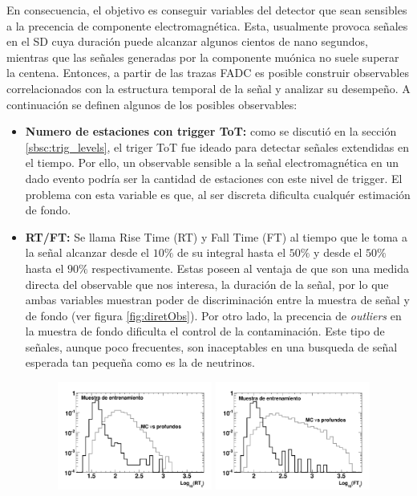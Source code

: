 	En consecuencia, el objetivo es conseguir variables del detector que sean sensibles a la precencia de componente electromagnética.
	Esta, usualmente provoca señales en el SD cuya duración puede alcanzar algunos cientos de nano segundos, mientras que las señales generadas por la componente muónica no suele superar la centena.
	Entonces, a partir de las trazas FADC es posible construir observables correlacionados con la estructura temporal de la señal y analizar su desempeño.
	A continuación se definen algunos de los posibles observables:
	\begin{itemize}
	 \item \textbf{Numero de estaciones con trigger ToT:} como se discutió en la sección \ref{sbsc:trig_levels}, el triger ToT fue ideado para detectar señales extendidas en el tiempo.
	 Por ello, un observable sensible a la señal electromagnética en un dado evento podría ser la cantidad de estaciones con este nivel de trigger.
	 El problema con esta variable es que, al ser discreta dificulta cualquér estimación de fondo.
	 \item \textbf{RT/FT:} Se llama Rise Time (RT) y Fall Time (FT) al tiempo que le toma a la señal alcanzar desde el $10\%$ de su integral hasta el $50\%$ y desde el $50\%$ hasta el $90\%$ respectivamente.
	 Estas poseen al ventaja de que son una medida directa del observable que nos interesa, la duración de la señal, por lo que ambas variables muestran poder de discriminación entre la muestra de señal y de fondo (ver figura \ref{fig:diretObs}).
	 Por otro lado, la precencia de \emph{outliers} en la muestra de fondo dificulta el control de la contaminación.
	 Este tipo de señales, aunque poco frecuentes, son inaceptables en una busqueda de señal esperada tan pequeña como es la de neutrinos.
	 \begin{figure}[ht!]
		\begin{center}
		\includegraphics[width=0.48\textwidth]{fig/seleccionAuger/rt1}
		\hfill
		\includegraphics[width=0.48\textwidth]{fig/seleccionAuger/ft1}

\end{center}
\end{figure}
\end{itemize}
